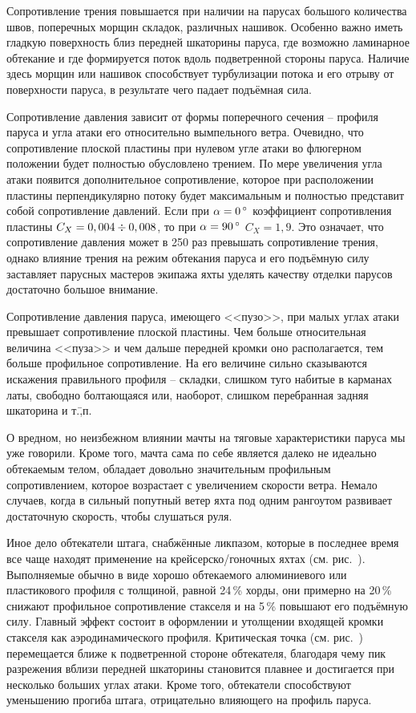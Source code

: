 Сопротивление трения повышается при наличии на парусах большого количества швов, поперечных морщин складок, различных нашивок. Особенно важно иметь гладкую поверхность близ передней шкаторины паруса, где возможно ламинарное обтекание и где формируется поток вдоль подветренной стороны паруса. Наличие здесь морщин или нашивок способствует турбулизации потока и его отрыву от поверхности паруса, в результате чего падает подъёмная сила. 

Сопротивление давления зависит от формы поперечного сечения \--- профиля паруса и угла атаки его относительно вымпельного ветра. Очевидно, что сопротивление плоской пластины при нулевом угле атаки во флюгерном положении будет полностью обусловлено трением. По мере увеличения угла атаки появится дополнительное сопротивление, которое при расположении пластины перпендикулярно потоку будет максимальным и полностью представит собой сопротивление давлений. Если при $\alpha = 0\,^\circ$ коэффициент сопротивления пластины $C_X = 0,004\div 0,008$, то при $\alpha = 90\,^\circ$ $C_X = 1,9$. Это означает, что сопротивление давления может в 250 раз превышать сопротивление трения, однако влияние трения на режим обтекания паруса и его подъёмную силу заставляет парусных мастеров экипажа яхты уделять качеству отделки парусов достаточно большое внимание.

Сопротивление давления паруса, имеющего <<пузо>>, при малых углах атаки превышает сопротивление плоской пластины. Чем больше относительная величина <<пуза>> и чем дальше передней кромки оно располагается, тем больше профильное сопротивление. На его величине сильно сказываются искажения правильного профиля \--- складки, слишком туго набитые в карманах латы, свободно болтающаяся или, наоборот, слишком перебранная задняя шкаторина и т.\=,п.
 
О вредном, но неизбежном влиянии мачты на тяговые характеристики паруса мы уже говорили. Кроме того, мачта сама по себе является далеко не идеально обтекаемым телом, обладает довольно значительным профильным сопротивлением, которое возрастает с увеличением скорости ветра. Немало случаев, когда в сильный попутный ветер яхта под одним рангоутом развивает достаточную скорость, чтобы слушаться руля.

Иное дело обтекатели штага, снабжённые ликпазом, которые в последнее время все чаще находят применение на крейсерско\-/гоночных яхтах (см. рис.~). Выполняемые обычно в виде хорошо обтекаемого алюминиевого или пластикового профиля с толщиной, равной 24\,\% хорды, они примерно на 20\,\% снижают профильное сопротивление стакселя и на 5\,\% повышают его подъёмную силу. Главный эффект состоит в оформлении и утолщении входящей кромки стакселя как аэродинамического профиля. Критическая точка (см. рис.~) перемещается ближе к подветренной стороне обтекателя, благодаря чему пик разрежения вблизи передней шкаторины становится плавнее и достигается при несколько больших углах атаки. Кроме того, обтекатели способствуют уменьшению прогиба штага, отрицательно влияющего на профиль паруса.


